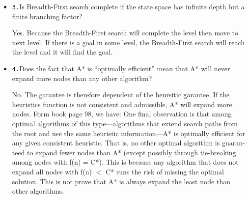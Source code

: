 \documentclass{article}
\begin{document}
\begin{itemize}
    \item \texttt{3.}Is Breadth-First search complete if the state space has infinite depth but a finite branching factor?
    
    Yes. Because the Breadth-First search will complete the level then move to next level. If there is a goal in some level,
    the Breadth-First search will reach the level and it will find the goal.
\end{itemize}

\begin{itemize}
    \item \texttt{4.}Does the fact that A* is ``optimally efficient'' mean that A* will never expand more nodes than any other algorithm?
    
    No. The garantee is therefore dependent of the heursitic garantee. If the heuristics function is not consistent and admissible, A* will expand more nodes.
    Form book page 98, we have:\newline
    One final observation is that among optimal algorithms of this type—algorithms that
extend search paths from the root and use the same heuristic information—A* is optimally
efficient for any given consistent heuristic. That is, no other optimal algorithm is guaran- 
teed to expand fewer nodes than A* (except possibly through tie-breaking among nodes with
f(n) = C*). This is because any algorithm that does not expand all nodes with f(n) $<$ C*
runs the risk of missing the optimal solution.\newline
    This is not prove that A* is always expand the least node than other algorithms.
\end{itemize}
\end{document}
